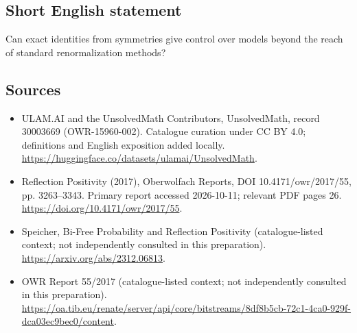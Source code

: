 \documentclass[11pt]{article}
\begin{document}
\subsection{Short English statement}
Can exact identities from symmetries give control over models beyond the reach of standard renormalization methods?
\subsection{Sources}
\begin{itemize}
\item[\hypertarget{source:30003669:1}{S1}] ULAM.AI and the UnsolvedMath Contributors, UnsolvedMath, record 30003669 (OWR-15960-002). Catalogue curation under CC BY 4.0; definitions and English exposition added locally.
\url{https://huggingface.co/datasets/ulamai/UnsolvedMath}.
\item[\hypertarget{source:30003669:2}{S2}] Reflection Positivity (2017), Oberwolfach Reports, DOI 10.4171/owr/2017/55, pp. 3263--3343. Primary report accessed 2026-10-11; relevant PDF pages 26.
\url{https://doi.org/10.4171/owr/2017/55}.
\item[\hypertarget{source:30003669:3}{S3}] Speicher, Bi-Free Probability and Reflection Positivity (catalogue-listed context; not independently consulted in this preparation).
\url{https://arxiv.org/abs/2312.06813}.
\item[\hypertarget{source:30003669:4}{S4}] OWR Report 55/2017 (catalogue-listed context; not independently consulted in this preparation).
\url{https://oa.tib.eu/renate/server/api/core/bitstreams/8df8b5cb-72c1-4ca0-929f-dca03ec9bec0/content}.
\end{itemize}
\label{end:30003669}
\end{document}
